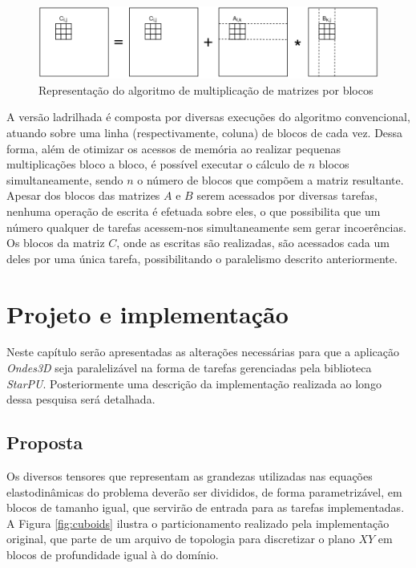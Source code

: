 \documentclass[cic,tc]{iiufrgs}
\begin{document}
\begin{figure}[!htb]
    \caption{Representação do algoritmo de multiplicação de matrizes por blocos}
    \begin{center}
      \includegraphics[width=35em]{gemm}
    \end{center}
    \label{fig:gemm}
\end{figure}

A versão ladrilhada é composta por diversas execuções do algoritmo convencional, atuando sobre uma linha (respectivamente, coluna) de blocos de cada vez. Dessa forma, além de otimizar os
acessos de memória ao realizar pequenas multiplicações bloco a bloco, é possível executar o cálculo de $n$ blocos simultaneamente, sendo $n$ o número de blocos que compõem a matriz resultante.
Apesar dos blocos das matrizes $A$ e $B$ serem acessados por diversas tarefas, nenhuma operação de escrita é efetuada sobre eles, o que possibilita que um número qualquer de tarefas acessem-nos
simultaneamente sem gerar incoerências. Os blocos da matriz $C$, onde as escritas são realizadas, são acessados cada um deles por uma única tarefa, possibilitando o paralelismo descrito anteriormente.

\chapter{Projeto e implementação}
Neste capítulo serão apresentadas as alterações necessárias para que a aplicação \textit{Ondes3D} seja paralelizável na forma de tarefas gerenciadas pela biblioteca \textit{StarPU}.
Posteriormente uma descrição da implementação realizada ao longo dessa pesquisa será detalhada.

\section{Proposta}\label{sec:proposal}

Os diversos tensores que representam as grandezas utilizadas nas equações elastodinâmicas do problema deverão ser divididos, de forma parametrizável, em blocos de tamanho igual, que servirão
de entrada para as tarefas implementadas. A Figura \ref{fig:cuboids} ilustra o particionamento realizado pela implementação original, que parte de um arquivo de topologia para discretizar o
plano $XY$ em blocos de profundidade igual à do domínio.
\end{document}
